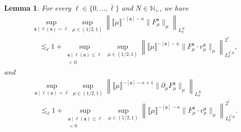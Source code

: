 \documentclass{article}
\numberwithin{equation}{section}
\theoremstyle{plain}
\newtheorem{lemma}[theorem]{Lemma}
\theoremstyle{definition}
\begin{document}
\begin{lemma}
  \label{lem:loc-kernels}For every \(\ell\in\{0,\ldots,\bar\ell\}\) and \(N\in\mathbb N_+\), we have
  \begin{equation}
    \begin{aligned}
      &\sup_{\mathfrak{a}\mid \ell(\mathfrak{a}) = \ell}
      \sup_{\mu \in (1 / 2, 1)}
      \left\| \llbracket \mu \rrbracket^{- [\mathfrak{a}] - \kappa}
      \| F^{\mathfrak{a}}_{\mu} \|_{\mu} \right\|_{L_{\mathbb{P}}^N}\\
      &\quad \lesssim_{\ell} 1
      + \sup_{\substack{\mathfrak{a}\mid
      \ell(\mathfrak{a}) \leqslant \ell\\ [\mathfrak{a}] < 0}}
      \sup_{\mu \in (1 / 2, 1)}
      \left\| \llbracket \mu \rrbracket^{- [\mathfrak{a}] - \kappa}
      \| F^{\mathfrak{a}}_{\mu} \cdot v^{\mathfrak{a}}_{\mu}
      \|_{\mu} \right\|_{L_{\mathbb{P}}^{2^{\ell} N}}^{2^{\ell}},
    \end{aligned}
    \label{eq:lemma-F-vF}
  \end{equation}
  and
  \begin{equation}
    \begin{aligned}
      &\sup_{\mathfrak{a}\mid \ell(\mathfrak{a}) = \ell}
      \sup_{\mu \in (1 / 2, 1)}
      \left\| \llbracket \mu \rrbracket^{- [\mathfrak{a}] - \kappa + 1}
      \| \partial_{\mu} F^{\mathfrak{a}}_{\mu} \|_{\mu}
      \right\|_{L_{\mathbb{P}}^N}\\
      &\quad \lesssim_{\ell} 1
      + \sup_{\substack{\mathfrak{a}\mid
      \ell(\mathfrak{a}) \leqslant \ell\\ [\mathfrak{a}] < 0}}
      \sup_{\mu \in (1 / 2, 1)}
      \left\| \llbracket \mu \rrbracket^{- [\mathfrak{a}] - \kappa}
      \| F^{\mathfrak{a}}_{\mu} \cdot v^{\mathfrak{a}}_{\mu}
      \|_{\mu} \right\|_{L_{\mathbb{P}}^{2^{\ell} N}}^{2^{\ell}} .
    \end{aligned}
    \label{eq:lemma-dot-F-vF}
  \end{equation}
\end{lemma}
\end{document}
